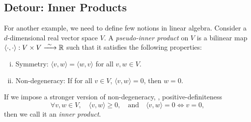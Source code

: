 \subsection{Detour: Inner Products}

For another example, we need to define few notions in linear algebra. Consider a \(d\)-dimensional real vector space \(V\). A \emph{pseudo-inner product} on \(V\) is a bilinear map \(\langle \cdot, \cdot \rangle: V \times V \xrightarrow{\ \sim\ } \mathbb R\) such that it satisfies the following properties:
\begin{enumerate}[(i)]
    \item Symmetry: \(\langle v, w \rangle = \langle w, v \rangle\) for all \(v, w \in V\).
    \item Non-degeneracy: If for all \(v \in V\), \(\langle v, w \rangle = 0\), then \(w = 0\).
\end{enumerate}
If we impose a stronger version of non-degeneracy, \ie, positive-definiteness
\begin{equation*}
    \forall v, w \in V, \quad \langle v, w \rangle \geq 0, \quad \text{and} \quad \langle v, w \rangle = 0 \iff v = 0,
\end{equation*}
then we call it an \emph{inner product}.

